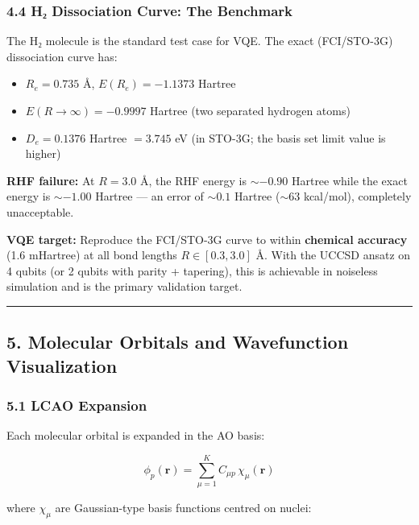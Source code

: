 \documentclass[
  11pt,
]{report}
\providecommand{\tightlist}{%
  \setlength{\itemsep}{0pt}\setlength{\parskip}{0pt}}
\begin{document}
\subsubsection{4.4 H₂ Dissociation Curve: The
Benchmark}\label{hux2082-dissociation-curve-the-benchmark}

The H₂ molecule is the standard test case for VQE. The exact
(FCI/STO-3G) dissociation curve has:

\begin{itemize}
\tightlist
\item
  \(R_e = 0.735\) Å, \(E(R_e) = -1.1373\) Hartree
\item
  \(E(R \to \infty) = -0.9997\) Hartree (two separated hydrogen atoms)
\item
  \(D_e = 0.1376\) Hartree \(= 3.745\) eV (in STO-3G; the basis set
  limit value is higher)
\end{itemize}

\textbf{RHF failure:} At \(R = 3.0\) Å, the RHF energy is \(\sim -0.90\)
Hartree while the exact energy is \(\sim -1.00\) Hartree --- an error of
\(\sim 0.1\) Hartree (\(\sim 63\) kcal/mol), completely unacceptable.

\textbf{VQE target:} Reproduce the FCI/STO-3G curve to within
\textbf{chemical accuracy} (1.6 mHartree) at all bond lengths
\(R \in [0.3, 3.0]\) Å. With the UCCSD ansatz on 4 qubits (or 2 qubits
with parity + tapering), this is achievable in noiseless simulation and
is the primary validation target.

\begin{center}\rule{0.5\linewidth}{0.5pt}\end{center}

\subsection{5. Molecular Orbitals and Wavefunction
Visualization}\label{molecular-orbitals-and-wavefunction-visualization}

\subsubsection{5.1 LCAO Expansion}\label{lcao-expansion}

Each molecular orbital is expanded in the AO basis:

\[\phi_p(\mathbf{r}) = \sum_{\mu=1}^{K} C_{\mu p}\, \chi_\mu(\mathbf{r})\]

where \(\chi_\mu\) are Gaussian-type basis functions centred on nuclei:
\end{document}
